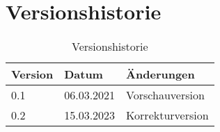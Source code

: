 \section{Versionshistorie}

\begin{table}[ht]
  \centering
  \begin{tabular}{|l|l|l|}
    \hline
    \textbf{Version} & \textbf{Datum} & \textbf{Änderungen} \\ \hline
    0.1              & 06.03.2021     & Vorschauversion     \\ \hline
    0.2              & 15.03.2023     & Korrekturversion    \\ \hline
  \end{tabular}
  \caption{Versionshistorie}
  \label{tab:versionshistorie}
\end{table}